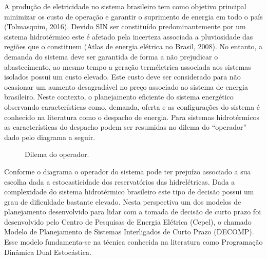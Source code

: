 \documentclass[12pt,fleqn]{article}
\begin{document}
 A produ\c c\~ao de eletricidade no sistema brasileiro tem como objetivo principal minimizar
os custo de opera\c c\~ao e garantir o suprimento de energia em todo o pa\'is (Tolmasquim, 2016). Devido SIN ser
constitu\'ido predominantemente por um sistema hidrot\'ermico este \'e afetado pela incerteza associada a pluviosidade
das regi\~oes que o constituem (Atlas de
energia el\'etrica no Brasil, 2008). No entanto, a demanda do sistema deve ser garantida de forma a n\~ao prejudicar o
abastecimento, ao mesmo tempo a gera\c c\~ao term\'eletrica associada aos sistemas isolados possui um custo elevado. Este custo deve ser considerado para n\~ao ocasionar um
aumento desagrad\'avel no pre\c co  associado ao sistema de energia brasileiro. Neste contexto, o planejamento eficiente do sistema energ\'etico observando caracter\'isticas como, demanda, oferta e
  as configura\c c\~oes do sistema \'e conhecido na literatura como o despacho de energia. Para sistemas
 hidrot\'ermicos as caracter\'isticas do despacho podem ser resumidas no dilema do
 ``operador'' dado pelo diagrama a seguir.
 \begin{figure}[!h]
   \centering
 \caption {Dilema do operador.}  
 \label{fig1}
 \end{figure}

Conforme o diagrama o operador do sistema pode ter preju\'izo associado a sua escolha dada a estocasticidade dos
reservat\'orios das hidrel\'etricas. Dada a complexidade do sistema hidrot\'ermico
brasileiro este tipo de decis\~ao possui um grau de dificuldade bastante elevado. Nesta perspectiva um dos modelos de
planejamento desenvolvido para lidar com a tomada de decis\~ao de curto prazo foi desenvolvido pelo Centro de
Pesquisas de Energia El\'etrica (Cepel), o chamado Modelo de Planejamento de Sistemas Interligados de
Curto Prazo (DECOMP). Esse modelo fundamenta-se na t\'ecnica conhecida na literatura como Programa\c c\~ao Din\^amica
Dual Estoc\'astica.
\end{document}
